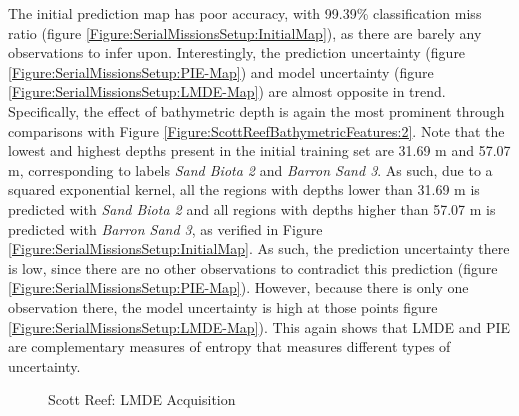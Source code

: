 			The initial prediction map has poor accuracy, with 99.39\% classification miss ratio (figure \ref{Figure:SerialMissionsSetup:InitialMap}), as there are barely any observations to infer upon. Interestingly, the prediction uncertainty (figure \ref{Figure:SerialMissionsSetup:PIE-Map}) and model uncertainty (figure \ref{Figure:SerialMissionsSetup:LMDE-Map}) are almost opposite in trend. Specifically, the effect of bathymetric depth is again the most prominent through comparisons with Figure \ref{Figure:ScottReefBathymetricFeatures:2}. Note that the lowest and highest depths present in the initial training set are 31.69 m and 57.07 m, corresponding to labels \textit{Sand Biota 2} and \textit{Barron Sand 3}. As such, due to a squared exponential kernel, all the regions with depths lower than 31.69 m is predicted with \textit{Sand Biota 2} and all regions with depths higher than 57.07 m is predicted with \textit{Barron Sand 3}, as verified in Figure \ref{Figure:SerialMissionsSetup:InitialMap}. As such, the prediction uncertainty there is low, since there are no other observations to contradict this prediction (figure \ref{Figure:SerialMissionsSetup:PIE-Map}). However, because there is only one observation there, the model uncertainty is high at those points figure \ref{Figure:SerialMissionsSetup:LMDE-Map}). This again shows that LMDE and PIE are complementary measures of entropy that measures different types of uncertainty.
	
			\begin{figure}[!htbp]
			\centering
			\caption{Scott Reef: LMDE Acquisition}
			\label{Figure:SerialOptimalPaths:LMDE}
			\end{figure}

